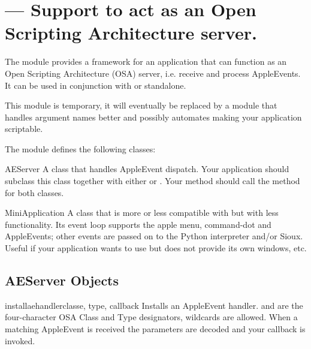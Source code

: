 \section{ ---
         Support to act as an Open Scripting Architecture server.}



The module  provides a framework for an application
that can function as an Open Scripting Architecture
(OSA) server, i.e. receive and process
AppleEvents. It can be used in conjunction with
 or standalone.

This module is temporary, it will eventually be replaced by a module
that handles argument names better and possibly automates making your
application scriptable.

The  module defines the following classes:


\begin{classdesc}{AEServer}{}
A class that handles AppleEvent dispatch. Your application should
subclass this class together with either
 or
. Your  method should
call the  method for both classes.
\end{classdesc}

\begin{classdesc}{MiniApplication}{}
A class that is more or less compatible with
 but with less functionality. Its
event loop supports the apple menu, command-dot and AppleEvents; other
events are passed on to the Python interpreter and/or Sioux.
Useful if your application wants to use  but does not
provide its own windows, etc.
\end{classdesc}


\subsection{AEServer Objects}
\label{aeserver-objects}

\begin{methoddesc}[AEServer]{installaehandler}{classe, type, callback}
Installs an AppleEvent handler.  and  are the
four-character OSA Class and Type designators,  wildcards
are allowed. When a matching AppleEvent is received the parameters are
decoded and your callback is invoked.
\end{methoddesc}

